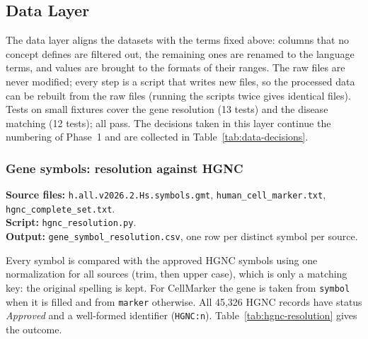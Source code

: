 \subsection{Data Layer}

The data layer aligns the datasets with the terms fixed above: columns that no concept defines are filtered out, the remaining ones are renamed to the language terms, and values are brought to the formats of their ranges. The raw files are never modified; every step is a script that writes new files, so the processed data can be rebuilt from the raw files (running the scripts twice gives identical files). Tests on small fixtures cover the gene resolution (13 tests) and the disease matching (12 tests); all pass. The decisions taken in this layer continue the numbering of Phase~1 and are collected in Table~\ref{tab:data-decisions}.

\subsubsection{Gene symbols: resolution against HGNC}

{\raggedright \noindent\textbf{Source files:} \texttt{h.all.v2026.2.Hs.symbols.gmt}, \texttt{human\_cell\_marker.txt}, \texttt{hgnc\_complete\_set.txt}.\\ \textbf{Script:} \texttt{hgnc\_resolution.py}.\\ \textbf{Output:} \texttt{gene\_symbol\_resolution.csv}, one row per distinct symbol per source.\par}

Every symbol is compared with the approved HGNC symbols using one normalization for all sources (trim, then upper case), which is only a matching key: the original spelling is kept. For CellMarker the gene is taken from \texttt{symbol} when it is filled and from \texttt{marker} otherwise. All 45,326 HGNC records have status \emph{Approved} and a well-formed identifier (\texttt{HGNC:n}). Table~\ref{tab:hgnc-resolution} gives the outcome.

